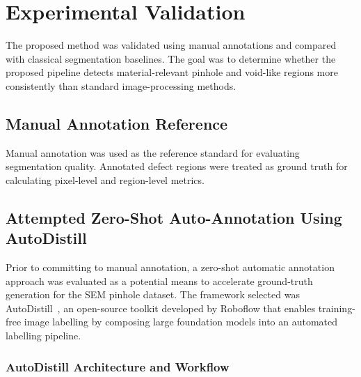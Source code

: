 \documentclass[pdflatex,sn-mathphys-num,iicol]{sn-jnl}
\theoremstyle{thmstyleone}
\theoremstyle{thmstyletwo}
\theoremstyle{thmstylethree}
\begin{document}

\section{Experimental Validation}\label{sec:validation}

The proposed method was validated using manual annotations and
compared with classical segmentation baselines. The goal was to
determine whether the proposed pipeline detects material-relevant
pinhole and void-like regions more consistently than standard
image-processing methods.

\subsection{Manual Annotation Reference}\label{subsec:manual_reference}

Manual annotation was used as the reference standard for evaluating
segmentation quality. Annotated defect regions were treated as ground
truth for calculating pixel-level and region-level metrics.


\subsection{Attempted Zero-Shot Auto-Annotation Using AutoDistill}
\label{subsec:autodistill}

Prior to committing to manual annotation, a zero-shot automatic
annotation approach was evaluated as a potential means to accelerate
ground-truth generation for the SEM pinhole dataset. The framework
selected was AutoDistill~\cite{autodistill2023}, an open-source
toolkit developed by Roboflow that enables training-free image labelling
by composing large foundation models into an automated labelling
pipeline.

\subsubsection{AutoDistill Architecture and Workflow}
\label{subsubsec:autodistill_arch}
\end{document}
